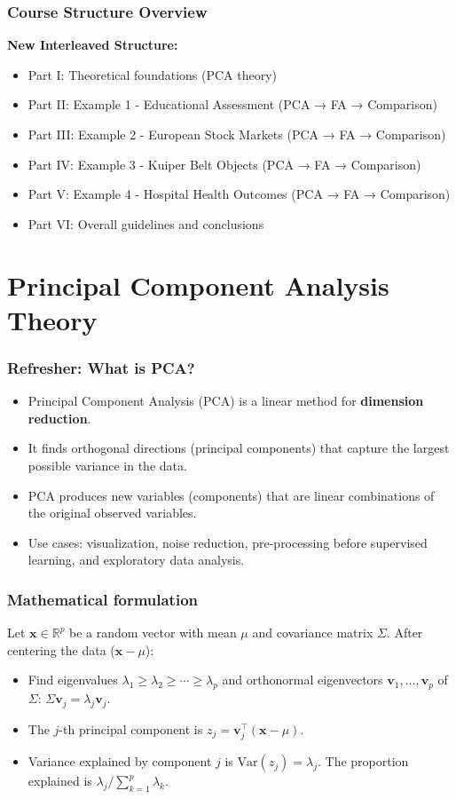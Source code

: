 \documentclass[aspectratio=169]{beamer}
\begin{document}
\begin{frame}[fragile]
    \frametitle{Course Structure Overview}
    \textbf{New Interleaved Structure:}
    \begin{itemize}
        \item Part I: Theoretical foundations (PCA theory)
        \item Part II: Example 1 - Educational Assessment (PCA → FA → Comparison)
        \item Part III: Example 2 - European Stock Markets (PCA → FA → Comparison)
        \item Part IV: Example 3 - Kuiper Belt Objects (PCA → FA → Comparison)
        \item Part V: Example 4 - Hospital Health Outcomes (PCA → FA → Comparison)
        \item Part VI: Overall guidelines and conclusions
    \end{itemize}
\end{frame}

\section{Principal Component Analysis Theory}

\begin{frame}
    \frametitle{Refresher: What is PCA?}
    \begin{itemize}
        \item Principal Component Analysis (PCA) is a linear method for \textbf{dimension reduction}. \pause
        \item It finds orthogonal directions (principal components) that capture the largest possible variance in the data. \pause
        \item PCA produces new variables (components) that are linear combinations of the original observed variables. \pause
        \item Use cases: visualization, noise reduction, pre-processing before supervised learning, and exploratory data analysis. \pause
    \end{itemize}
\end{frame}

\begin{frame}
    \frametitle{Mathematical formulation}
    Let $\mathbf{x}\in\mathbb{R}^p$ be a random vector with mean $\mu$ and covariance matrix $\Sigma$. After centering the data ($\mathbf{x}-\mu$):
    \begin{itemize}
        \item Find eigenvalues $\lambda_1\ge\lambda_2\ge\cdots\ge\lambda_p$ and orthonormal eigenvectors $\mathbf{v}_1,\dots,\mathbf{v}_p$ of $\Sigma$: $\Sigma\mathbf{v}_j=\lambda_j\mathbf{v}_j$. \pause
        \item The $j$-th principal component is $z_j=\mathbf{v}_j^{\top}(\mathbf{x}-\mu)$. \pause
        \item Variance explained by component $j$ is $\mathrm{Var}(z_j)=\lambda_j$. The proportion explained is $\lambda_j/\sum_{k=1}^p\lambda_k$. \pause
    \end{itemize}
\end{frame}
\end{document}
